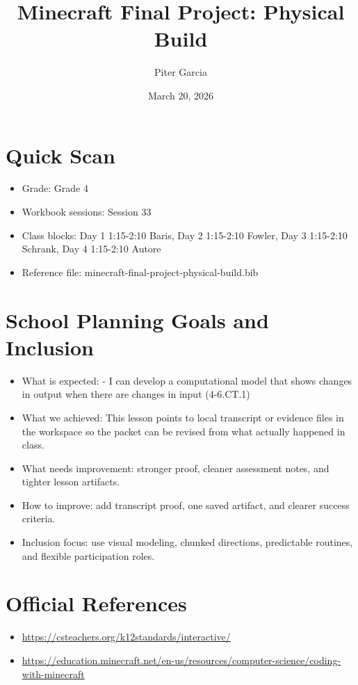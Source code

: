 \documentclass[11pt]{article}
\title{Minecraft Final Project: Physical Build}
\author{Piter Garcia}
\date{March 20, 2026}
\begin{document}
    \maketitle
    \section*{Quick Scan}
    \begin{itemize}[leftmargin=*]
    \item Grade: Grade 4
    \item Workbook sessions: Session 33
    \item Class blocks: Day 1 1:15-2:10 Baris, Day 2 1:15-2:10 Fowler, Day 3 1:15-2:10 Schrank, Day 4 1:15-2:10 Autore
    \item Reference file: minecraft-final-project-physical-build.bib
    \end{itemize}
    \section*{School Planning Goals and Inclusion}
    \begin{itemize}[leftmargin=*]
    \item What is expected: - I can develop a computational model that shows changes in output when there are changes in input (4-6.CT.1)
    \item What we achieved: This lesson points to local transcript or evidence files in the workspace so the packet can be revised from what actually happened in class.
    \item What needs improvement: stronger proof, cleaner assessment notes, and tighter lesson artifacts.
    \item How to improve: add transcript proof, one saved artifact, and clearer success criteria.
    \item Inclusion focus: use visual modeling, chunked directions, predictable routines, and flexible participation roles.
    \end{itemize}
    \section*{Official References}
    \begin{itemize}[leftmargin=*]
    \item \url{https://csteachers.org/k12standards/interactive/}
\item \url{https://education.minecraft.net/en-us/resources/computer-science/coding-with-minecraft}

    \end{itemize}
    
\end{document}
